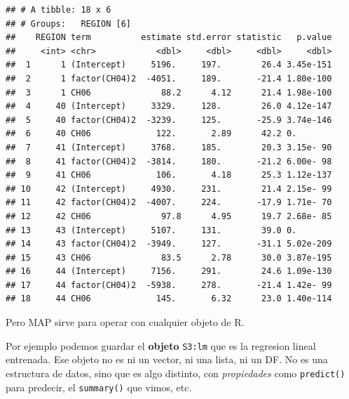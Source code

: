\documentclass[]{book}
\newenvironment{Shaded}{\begin{snugshade}}{\end{snugshade}}
\newcommand{\ControlFlowTok}[1]{\textcolor[rgb]{0.13,0.29,0.53}{\textbf{#1}}}
\newcommand{\DataTypeTok}[1]{\textcolor[rgb]{0.13,0.29,0.53}{#1}}
\newcommand{\KeywordTok}[1]{\textcolor[rgb]{0.13,0.29,0.53}{\textbf{#1}}}
\newcommand{\NormalTok}[1]{#1}
\newcommand{\OperatorTok}[1]{\textcolor[rgb]{0.81,0.36,0.00}{\textbf{#1}}}
\newcommand{\StringTok}[1]{\textcolor[rgb]{0.31,0.60,0.02}{#1}}
\begin{document}
\begin{verbatim}
## # A tibble: 18 x 6
## # Groups:   REGION [6]
##    REGION term          estimate std.error statistic   p.value
##     <int> <chr>            <dbl>     <dbl>     <dbl>     <dbl>
##  1      1 (Intercept)     5196.     197.        26.4 3.45e-151
##  2      1 factor(CH04)2  -4051.     189.       -21.4 1.80e-100
##  3      1 CH06              88.2      4.12      21.4 1.98e-100
##  4     40 (Intercept)     3329.     128.        26.0 4.12e-147
##  5     40 factor(CH04)2  -3239.     125.       -25.9 3.74e-146
##  6     40 CH06             122.       2.89      42.2 0.       
##  7     41 (Intercept)     3768.     185.        20.3 3.15e- 90
##  8     41 factor(CH04)2  -3814.     180.       -21.2 6.00e- 98
##  9     41 CH06             106.       4.18      25.3 1.12e-137
## 10     42 (Intercept)     4930.     231.        21.4 2.15e- 99
## 11     42 factor(CH04)2  -4007.     224.       -17.9 1.71e- 70
## 12     42 CH06              97.8      4.95      19.7 2.68e- 85
## 13     43 (Intercept)     5107.     131.        39.0 0.       
## 14     43 factor(CH04)2  -3949.     127.       -31.1 5.02e-209
## 15     43 CH06              83.5      2.78      30.0 3.87e-195
## 16     44 (Intercept)     7156.     291.        24.6 1.09e-130
## 17     44 factor(CH04)2  -5938.     278.       -21.4 1.42e- 99
## 18     44 CH06             145.       6.32      23.0 1.40e-114
\end{verbatim}

Pero MAP sirve para operar con cualquier objeto de R.

Por ejemplo podemos guardar el \textbf{objeto} \texttt{S3:lm} que es la regresion lineal entrenada. Ese objeto no es ni un vector, ni una lista, ni un DF. No es una estructura de datos, sino que es algo distinto, con \emph{propiedades} como \texttt{predict()} para predecir, el \texttt{summary()} que vimos, etc.

\begin{Shaded}
\end{Shaded}
\end{document}
